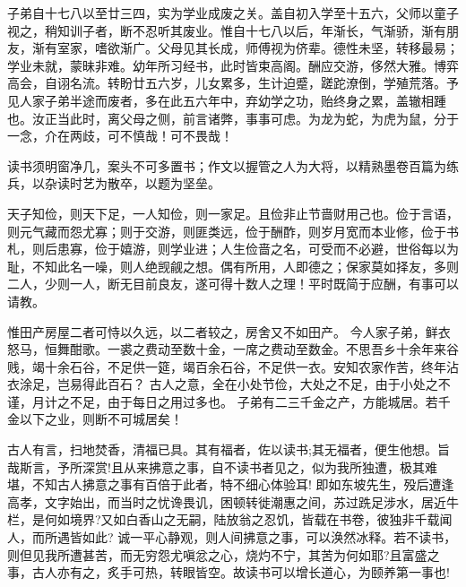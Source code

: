 \documentclass[letterpaper,10pt,english]{sphinxmanual}
\begin{document}
子弟自十七八以至廿三四，实为学业成废之关。盖自初入学至十五六，父师以童子视之，稍知训子者，断不忍听其废业。惟自十七八以后，年渐长，气渐骄，渐有朋友，渐有室家，嗜欲渐广。父母见其长成，师傅视为侪辈。德性未坚，转移最易；学业未就，蒙昧非难。幼年所习经书，此时皆束高阁。酬应交游，侈然大雅。博弈高会，自诩名流。转盼廿五六岁，儿女累多，生计迫蹙，蹉跎潦倒，学殖荒落。予见人家子弟半途而废者，多在此五六年中，弃幼学之功，贻终身之累，盖辙相踵也。汝正当此时，离父母之侧，前言诸弊，事事可虑。为龙为蛇，为虎为鼠，分于一念，介在两歧，可不慎哉！可不畏哉！

读书须明窗净几，案头不可多置书；作文以握管之人为大将，以精熟墨卷百篇为练兵，以杂读时艺为散卒，以题为坚垒。

天子知俭，则天下足，一人知俭，则一家足。且俭非止节啬财用己也。俭于言语，则元气藏而怨尤寡；则于交游，则匪类远，俭于酬酢，则岁月宽而本业修，俭于书札，则后患寡，俭于嬉游，则学业进；人生俭啬之名，可受而不必避，世俗每以为耻，不知此名一噪，则人绝觊觎之想。偶有所用，人即德之；保家莫如择友，多则二人，少则一人，断无目前良友，遂可得十数人之理！平时既简于应酬，有事可以请教。

惟田产房屋二者可恃以久远，以二者较之，房舍又不如田产。
今人家子弟，鲜衣怒马，恒舞酣歌。一裘之费动至数十金，一席之费动至数金。不思吾乡十余年来谷贱，竭十余石谷，不足供一筵，竭百余石谷，不足供一衣。安知农家作苦，终年沾衣涂足，岂易得此百石？
古人之意，全在小处节俭，大处之不足，由于小处之不谨，月计之不足，由于每日之用过多也。
子弟有二三千金之产，方能城居。若千金以下之业，则断不可城居矣！

古人有言，扫地焚香，清福已具。其有福者，佐以读书;其无福者，便生他想。旨哉斯言，予所深赏!且从来拂意之事，自不读书者见之，似为我所独遭，极其难堪，不知古人拂意之事有百倍于此者，特不细心体验耳! 即如东坡先生，殁后遭逢高孝，文字始出，而当时之忧谗畏讥，困顿转徙潮惠之间，苏过跣足涉水，居近牛栏，是何如境界?又如白香山之无嗣，陆放翁之忍饥，皆载在书卷，彼独非千载闻人，而所遇皆如此? 诚一平心静观，则人间拂意之事，可以涣然冰释。若不读书，则但见我所遭甚苦，而无穷怨尤嗔忿之心，烧灼不宁，其苦为何如耶?且富盛之事，古人亦有之，炙手可热，转眼皆空。故读书可以增长道心，为颐养第一事也!
\end{document}

